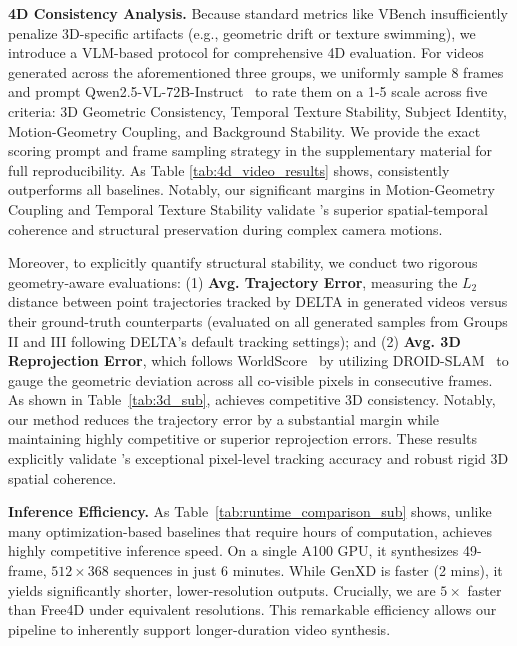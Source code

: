 \noindent\textbf{4D Consistency Analysis.} Because standard metrics like VBench insufficiently penalize 3D-specific artifacts (e.g., geometric drift or texture swimming), we introduce a VLM-based protocol for comprehensive 4D evaluation. For videos generated across the aforementioned three groups, we uniformly sample 8 frames and prompt Qwen2.5-VL-72B-Instruct~\cite{bai2025qwen2} to rate them on a 1-5 scale across five criteria: 3D Geometric Consistency, Temporal Texture Stability, Subject Identity, Motion-Geometry Coupling, and Background Stability. We provide the exact scoring prompt and frame sampling strategy in the supplementary material for full reproducibility. As Table \ref{tab:4d_video_results} shows, \ours consistently outperforms all baselines. Notably, our significant margins in Motion-Geometry Coupling and Temporal Texture Stability validate \ours's superior spatial-temporal coherence and structural preservation during complex camera motions.

Moreover, to explicitly quantify structural stability, we conduct two rigorous geometry-aware evaluations: (1) \textbf{Avg. Trajectory Error}, measuring the $L_2$ distance between point trajectories tracked by DELTA in generated videos versus their ground-truth counterparts (evaluated on all generated samples from Groups II and III following DELTA's default tracking settings); and (2) \textbf{Avg. 3D Reprojection Error}, which follows WorldScore~\cite{zhang2025world} by utilizing DROID-SLAM~\cite{teed2021droid} to gauge the geometric deviation across all co-visible pixels in consecutive frames. As shown in Table~\ref{tab:3d_sub}, \ours achieves competitive 3D consistency. Notably, our method reduces the trajectory error by a substantial margin while maintaining highly competitive or superior reprojection errors. These results explicitly validate \ours's exceptional pixel-level tracking accuracy and robust rigid 3D spatial coherence.

\noindent\textbf{Inference Efficiency.} As Table~\ref{tab:runtime_comparison_sub} shows, unlike many optimization-based baselines that require hours of computation, \ours achieves highly competitive inference speed. On a single A100 GPU, it synthesizes 49-frame, $512\times368$ sequences in just 6 minutes. While GenXD is faster (2 mins), it yields significantly shorter, lower-resolution outputs. Crucially, we are $5\times$ faster than Free4D under equivalent resolutions. This remarkable efficiency allows our pipeline to inherently support longer-duration video synthesis.


